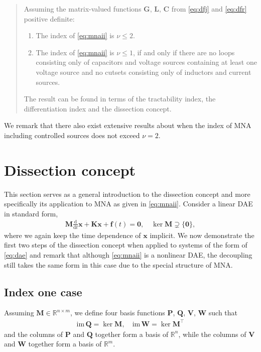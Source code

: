 \documentclass[AMA,STIX1COL]{WileyNJD-v2}
\newcommand{\mb}[1]{\mathbf{#1}}
\newcommand{\mr}[1]{\mathrm{#1}}
\newcommand{\T}{{\!\top}}
\newcommand{\ddt}{\frac{\mathrm{d}}{\mathrm{d}t}}
\begin{document}
\begin{quote}
    Assuming the matrix-valued functions $\mathbf{G}$, $\mathbf{L}$, $\mathbf{C}$ from \eqref{eq:dfj} and \eqref{eq:dfr} positive definite:
    \begin{enumerate}
        \item The index of \eqref{eq:mnaii} is $\nu \leq 2$.
        \item The index of \eqref{eq:mnaii} is $\nu \leq 1$, if and only if there are no loops consisting only of capacitors and voltage sources containing at least one voltage source and no cutsets consisting only of inductors and current sources.
    \end{enumerate}
    The result can be found in terms of the tractability index\cite{tischendorf1999}, the differentiation index \cite{estevez2000ijcta} and the dissection concept\cite{jansen2014}. %
\end{quote}
We remark that there also exist extensive results about when the index of MNA including controlled sources does not exceed $\nu = 2$\cite{estevez2000ijcta}.

\section{Dissection concept}
\label{sec:dc}
This section serves as a general introduction to the dissection concept and more specifically its application to MNA as given in \eqref{eq:mnaii}. Consider a linear DAE in standard form\cite{jansen2014},
\begin{align}
    \mb{M} \ddt \mb{x} + \mb{K} \mb{x} + \mb{f}(t) = \mb{0}, \quad \ker \mb{M} \supsetneq \{ \mb{0} \} \label{eq:dae},
\end{align}
where we again keep the time dependence of $\mb{x}$ implicit. We now demonstrate the first two steps of the dissection concept when applied to systems of the form of \eqref{eq:dae} and remark that although \eqref{eq:mnaii} is a nonlinear DAE, the decoupling still takes the same form in this case due to the special structure of MNA\cite{jansen2014}.

\subsection{Index one case}
Assuming $\mb{M} \in \mathbb{R}^{n \times m}$, we define four basis functions $\mb{P}$, $\mb{Q}$, $\mb{V}$, $\mb{W}$ such that
\begin{align*}
    \mr{im\, } \mb{Q} = \ker \mb{M}, \quad \mr{im\, } \mb{W} = \ker \mb{M}^{\T}
\end{align*}
and the columns of $\mb{P}$ and $\mb{Q}$ together form a basis of $\mathbb{R}^n$, while the columns of $\mb{V}$ and $\mb{W}$ together form a basis of $\mathbb{R}^m$.
\end{document}
